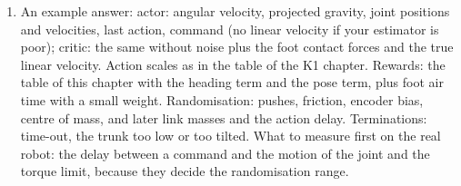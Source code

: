 \begin{enumerate}[label=\textbf{\ansnum.\arabic*}]
  \item An example answer: actor: angular velocity, projected gravity, joint positions and velocities, last action, command (no linear velocity if your estimator is poor); critic: the same without noise plus the foot contact forces and the true linear velocity. Action scales as in the table of the K1 chapter. Rewards: the table of this chapter with the heading term and the pose term, plus foot air time with a small weight. Randomisation: pushes, friction, encoder bias, centre of mass, and later link masses and the action delay. Terminations: time-out, the trunk too low or too tilted. What to measure first on the real robot: the delay between a command and the motion of the joint and the torque limit, because they decide the randomisation range.
\end{enumerate}
